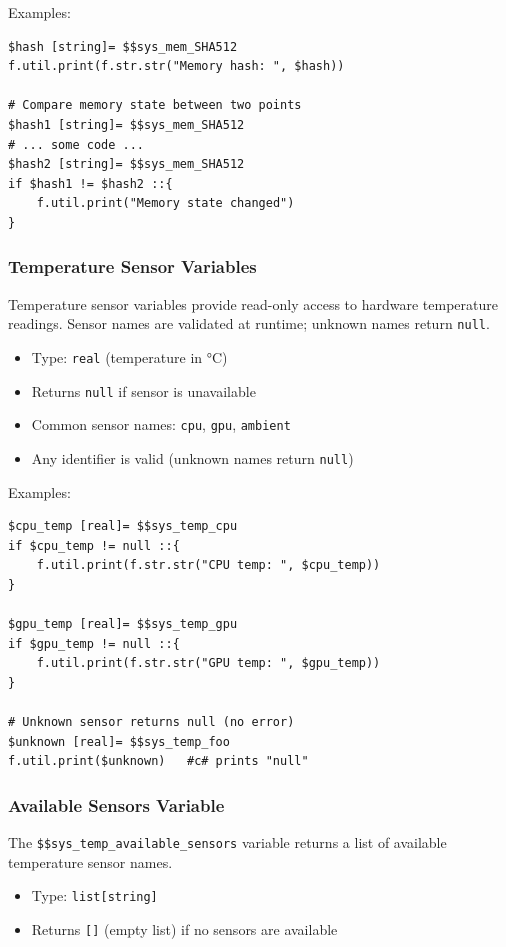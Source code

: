 Examples:
\begin{verbatim}
$hash [string]= $$sys_mem_SHA512
f.util.print(f.str.str("Memory hash: ", $hash))

# Compare memory state between two points
$hash1 [string]= $$sys_mem_SHA512
# ... some code ...
$hash2 [string]= $$sys_mem_SHA512
if $hash1 != $hash2 ::{
    f.util.print("Memory state changed")
}
\end{verbatim}

\subsubsection{Temperature Sensor Variables}
Temperature sensor variables provide read-only access to hardware temperature readings. Sensor names are validated at runtime; unknown names return \texttt{null}.

\begin{itemize}
\item Type: \texttt{real} (temperature in °C)
\item Returns \texttt{null} if sensor is unavailable
\item Common sensor names: \texttt{cpu}, \texttt{gpu}, \texttt{ambient}
\item Any identifier is valid (unknown names return \texttt{null})
\end{itemize}

Examples:
\begin{verbatim}
$cpu_temp [real]= $$sys_temp_cpu
if $cpu_temp != null ::{
    f.util.print(f.str.str("CPU temp: ", $cpu_temp))
}

$gpu_temp [real]= $$sys_temp_gpu
if $gpu_temp != null ::{
    f.util.print(f.str.str("GPU temp: ", $gpu_temp))
}

# Unknown sensor returns null (no error)
$unknown [real]= $$sys_temp_foo
f.util.print($unknown)   #c# prints "null"
\end{verbatim}

\subsubsection{Available Sensors Variable}
The \texttt{\$\$sys\_temp\_available\_sensors} variable returns a list of available temperature sensor names.

\begin{itemize}
\item Type: \texttt{list[string]}
\item Returns \texttt{[]} (empty list) if no sensors are available
\end{itemize}

